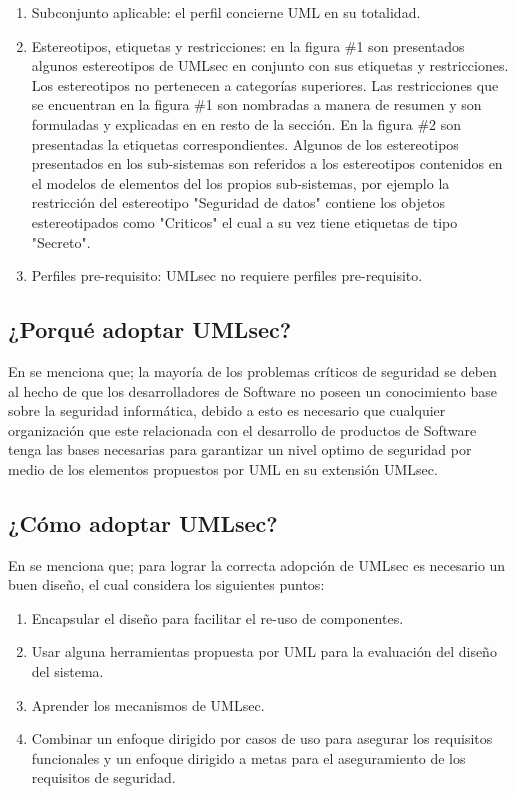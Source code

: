 \documentclass[runningheads,a4paper]{llncs}
\begin{document}
\begin{enumerate}
	\item Subconjunto aplicable: el perfil concierne \gls{UML} en su totalidad.\\
	\item Estereotipos, etiquetas y restricciones: en la figura \#1 son presentados algunos estereotipos de \gls{UMLsec} en conjunto con sus etiquetas y restricciones. Los estereotipos no pertenecen a categorías superiores. Las restricciones que se encuentran en la figura \#1 son nombradas a manera de resumen y son formuladas y explicadas en en resto de la sección. En la figura \#2 son presentadas la etiquetas correspondientes. Algunos de los estereotipos presentados en los sub-sistemas son referidos a los estereotipos contenidos en el modelos de elementos del los propios sub-sistemas, por ejemplo la restricción del estereotipo "Seguridad de datos" contiene los objetos estereotipados como "Criticos" el cual a su vez tiene etiquetas de tipo "Secreto".\\
	\item Perfiles pre-requisito: \gls{UMLsec} no requiere perfiles pre-requisito.
\end{enumerate}

\subsection{¿Porqué adoptar \gls{UMLsec}?}
En \cite{UMLsecExtending} se menciona que; la mayoría de los problemas críticos de seguridad se deben al hecho de que los desarrolladores de \gls{Software} no poseen un conocimiento base sobre la seguridad informática, debido a esto es necesario que cualquier organización que este relacionada con el desarrollo de productos de \gls{Software} tenga las bases necesarias para garantizar un nivel optimo de seguridad por medio de los elementos propuestos por \gls{UML} en su extensión \gls{UMLsec}.\\

\subsection{¿Cómo adoptar \gls{UMLsec}?}
En \cite{UsingUMLsec} se menciona que; para lograr la correcta adopción de \gls{UMLsec} es necesario un buen diseño, el cual considera los siguientes puntos:

\begin{enumerate}
	\item Encapsular el diseño para facilitar el re-uso de componentes.\\
	\item Usar alguna herramientas propuesta por \gls{UML} para la evaluación del diseño del sistema.\\
	\item Aprender los mecanismos de \gls{UMLsec}.\\
	\item Combinar un enfoque dirigido por casos de uso para asegurar los requisitos funcionales y un enfoque dirigido a metas para el aseguramiento de los requisitos de seguridad.\\
\end{enumerate}
\end{document}
